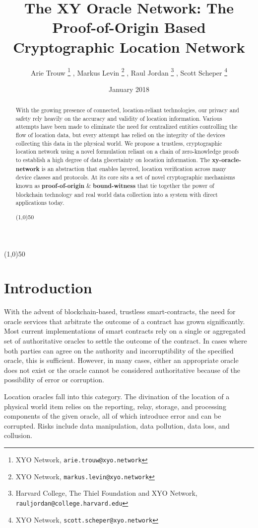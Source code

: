 \documentclass{article}
\title {The XY Oracle Network: The Proof-of-Origin Based Cryptographic Location Network}
\author{
    Arie Trouw
        \thanks{XYO Network, \texttt{arie.trouw@xyo.network}}
    , Markus Levin
        \thanks{XYO Network, \texttt{markus.levin@xyo.network}}
    , Raul Jordan
        \thanks{Harvard College, The Thiel Foundation and XYO Network, \texttt{rauljordan@college.harvard.edu}}
    , Scott Scheper
        \thanks{XYO Network, \texttt{scott.scheper@xyo.network}}
}
\date{January 2018}
\begin{document}
\maketitle

\begin{center}
\line(1,0){50}
\end{center}

\begin{abstract}
With the growing presence of connected, location-reliant technologies, our privacy and safety rely heavily on the \gls{accuracy} and validity of location information. Various attempts have been made to eliminate the need for centralized entities controlling the flow of location data, but every attempt has relied on the integrity of the devices collecting this data in the physical world. We propose a \gls{trustless}, cryptographic location network using a novel formulation reliant on a chain of zero-knowledge proofs to establish a high degree of data gls{certainty} on location information. The \textbf{\Gls{xy-oracle-network}} is an abstraction that enables layered, location verification across many device classes and protocols. At its core sits a set of novel cryptographic mechanisms known as \textbf{\Gls{proof-of-origin}} \& \textbf{\Gls{bound-witness}} that tie together the power of blockchain technology and real world data collection into a system with direct applications today.

\begin{center}
\line(1,0){50}
\end{center}
\end{abstract}

\section{Introduction}
With the advent of blockchain-based, \gls{trustless} \glspl{smart-contract}, the need for \gls{oracle} services that arbitrate the outcome of a contract has grown significantly. Most current implementations of smart contracts rely on a single or aggregated set of authoritative oracles to settle the outcome of the contract. In cases where both parties can agree on the authority and incorruptibility of the specified oracle, this is sufficient. However, in many cases, either an appropriate oracle does not exist or the oracle cannot be considered authoritative because of the possibility of error or corruption.

Location oracles fall into this category. The divination of the location of a physical world item relies on the reporting, relay, storage, and processing components of the given oracle, all of which introduce error and can be corrupted. Risks include data manipulation, data pollution, data loss, and collusion.
\end{document}
